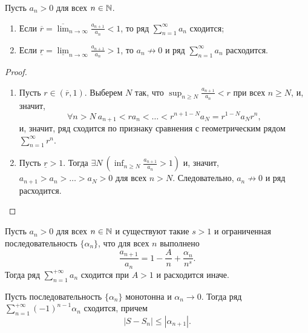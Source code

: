\begin{theorem}
    \label{dalambert-test}
    Пусть $a_n > 0$ для всех $n \in \mathbb{N}$.

    \begin{enumerate}
        \item Если $\overline{r} = \overline{\lim}_{n \rightarrow \infty} \frac{a_{n + 1}}{a_n} < 1$, то ряд $\sum_{n = 1}^\infty a_n$ сходится;
        \item Если $\underline{r} = \underline{\lim}_{n \rightarrow \infty} \frac{a_{n + 1}}{a_n} > 1$, то $a_n \not\rightarrow 0$ и ряд $\sum_{n = 1}^\infty a_n$ расходится.
    \end{enumerate}

    \begin{proof}
        \begin{enumerate}
            \item Пусть  $r \in (\overline{r}, 1)$. Выберем $N$ так, что $\sup_{n \ge N} \frac{a_{n + 1}}{a_n} < r$ при всех $n \ge N$, и, значит,
                \[
                    \forall n > N \ a_{n + 1} < ra_n < \ldots < r^{n + 1 - N} a_{N} = r^{1 - N} a_N r^n,
                \]
                и, значит, ряд сходится по признаку сравнения с геометрическим рядом $\sum_{n = 1}^\infty r^n$.

            \item Пусть $\underline{r} > 1$. Тогда $\exists N \ \left(\inf_{n \ge N} \frac{a_{n + 1}}{a_n} > 1\right)$ и, значит, $a_{n + 1} > a_n > \ldots > a_N > 0$ для всех $n > N$. Следовательно, $a_n \not\rightarrow 0$ и ряд расходится.
        \end{enumerate}
    \end{proof}
\end{theorem}

\begin{theorem}
    Пусть $a_{n} > 0$ для всех $n \in \mathbb{N}$ и существуют такие $s > 1$ и ограниченная последовательность $\{\alpha_{n}\}$, что для всех $n$ выполнено
    \[\frac{a_{n+1}}{a_{n}} = 1 - \frac{A}{n} + \frac{\alpha_{n}}{n^{s}}.\]
    Тогда ряд $\sum_{n = 1}^{+\infty} a_{n}$ сходится при $A > 1$ и расходится иначе. 
\end{theorem}

\begin{theorem}
    Пусть последовательность $\{\alpha_{n}\}$ монотонна и $\alpha_{n} \to 0$. Тогда ряд $\sum_{n = 1}^{+\infty} (-1)^{n - 1} \alpha_{n}$ сходится, причем
    \[|S - S_{n}| \leq |\alpha_{n + 1}|.\]
\end{theorem}

